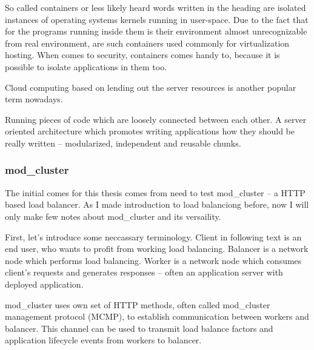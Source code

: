 \documentclass[
  master,
  biblatex,
  glossaries,
  index
]{kidiplom}
\begin{document}
So called containers or less likely heard words written in the heading are isolated instances of operating systems kernels running in user-space. Due to the fact that for the programs running inside them is their environment almost unrecognizable from real environment, are such containers used commonly for virtualization hosting. When comes to security, containers comes handy to, because it is possible to isolate applications in them too. 




Cloud computing based on lending out the server resources is another popular term nowadays.


Running pieces of code which are loosely connected between each other. A server oriented architecture which promotes writing applications how they should be really written -- modularized, independent and reusable chunks. %

\subsubsection{mod\_cluster}


The initial comes for this thesis comes from need to test mod\_cluster -- a HTTP based load balancer. As I made introduction to load balanciong before, now I will only make few notes about mod\_cluster and its versaility.

First, let's introduce some neccassary terminology. Client in following text is an end user, who wants to profit from working load balancing. Balancer is a network node which performs load balancing. Worker is a network node which consumes client's requests and generates responses -- often an application server with deployed application. %

mod\_cluster uses own set of HTTP methods, often called mod\_cluster management protocol (MCMP)\cite{bib:modcluster}, to establish communication between workers and balancer. This channel can be used to transmit load balance factors and application lifecycle events from workers to balancer.
\end{document}
